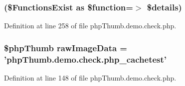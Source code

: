 \hypertarget{php_thumb_8demo_8check_8php_a6415d22e6459a27b21ea80a866c72ec1}{
\subsubsection[{foreach}]{(\$\-Functions\-Exist as \$function=$>$ \$details)}}\label{php_thumb_8demo_8check_8php_a6415d22e6459a27b21ea80a866c72ec1}


\-Definition at line 258 of file php\-Thumb.\-demo.\-check.\-php.

\hypertarget{php_thumb_8demo_8check_8php_a863670ff2c90a1dc616ebab121dbb296}{
\subsubsection[{raw\-Image\-Data}]{\setlength{\rightskip}{0pt plus 5cm}\$php\-Thumb {\bf raw\-Image\-Data} = 'php\-Thumb.\-demo.\-check.\-php\-\_\-cachetest'}}\label{php_thumb_8demo_8check_8php_a863670ff2c90a1dc616ebab121dbb296}


\-Definition at line 148 of file php\-Thumb.\-demo.\-check.\-php.

